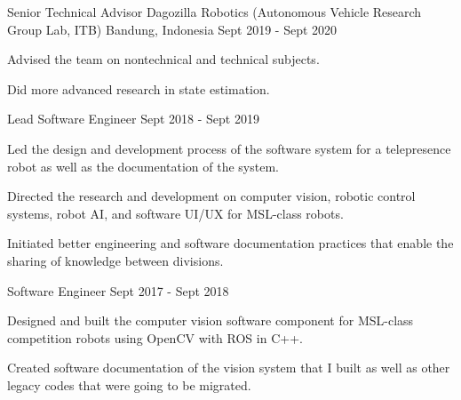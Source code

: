 

\begin{cventries}
\cventry
{Senior Technical Advisor} %
{Dagozilla Robotics (Autonomous Vehicle Research Group Lab, ITB)} %
{Bandung, Indonesia} %
{Sept 2019 - Sept 2020} %
{
	\begin{cvitems} %
		\item {Advised the team on nontechnical and technical subjects.}
		\item {Did more advanced research in state estimation.}
	\end{cvitems}
}

\cventry
{Lead Software Engineer} %
{} %
{} %
{Sept 2018 - Sept 2019} %
{
	\begin{cvitems} %
		\item {Led the design and development process of the software system for a telepresence robot as well as the documentation of the system.}
		\item {Directed the research and development on computer vision, robotic control systems, robot AI, and software UI/UX for MSL-class robots.}
		\item {Initiated better engineering and software documentation practices that enable the sharing of knowledge between divisions.}
	\end{cvitems}
}

\cventry
{Software Engineer} %
{} %
{} %
{Sept 2017 - Sept 2018} %
{
	\begin{cvitems} %
		\item {Designed and built the computer vision software component for MSL-class competition robots using OpenCV with ROS in C++.}
		\item {Created software documentation of the vision system that I built as well as other legacy codes that were going to be migrated.}
	\end{cvitems}
}


\end{cventries}
